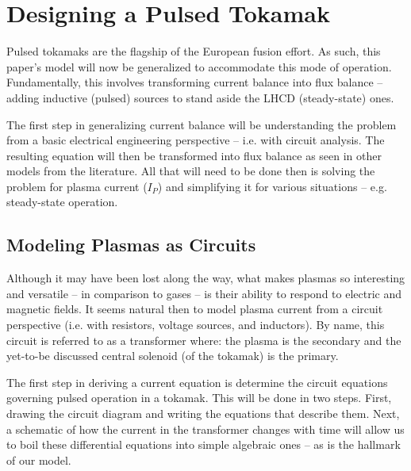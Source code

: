 %
%
%
%
%
%
%
%

\chapter{Designing a Pulsed Tokamak}

Pulsed tokamaks are the flagship of the European fusion effort. As such, this paper's model will now be generalized to accommodate this mode of operation. Fundamentally, this involves transforming current balance into flux balance -- adding inductive (pulsed) sources to stand aside the LHCD (steady-state) ones.

The first step in generalizing current balance will be understanding the problem from a basic electrical engineering perspective -- i.e. with circuit analysis. The resulting equation will then be transformed into flux balance as seen in other models from the literature. All that will need to be done then is solving the problem for plasma current ($I_P$) and simplifying it for various situations -- e.g. steady-state operation.

\section{Modeling Plasmas as Circuits}

Although it may have been lost along the way, what makes plasmas so interesting and versatile -- in comparison to gases -- is their ability to respond to electric and magnetic fields. It seems natural then to model plasma current from a circuit perspective (i.e. with resistors, voltage sources, and inductors). By name, this circuit is referred to as a transformer where: the plasma is the secondary and the yet-to-be discussed central solenoid (of the tokamak) is the primary.

The first step in deriving a current equation is determine the circuit equations governing pulsed operation in a tokamak. This will be done in two steps. First, drawing the circuit diagram and writing the equations that describe them. Next, a schematic of how the current in the transformer changes with time will allow us to boil these differential equations into simple algebraic ones -- as is the hallmark of our model.

